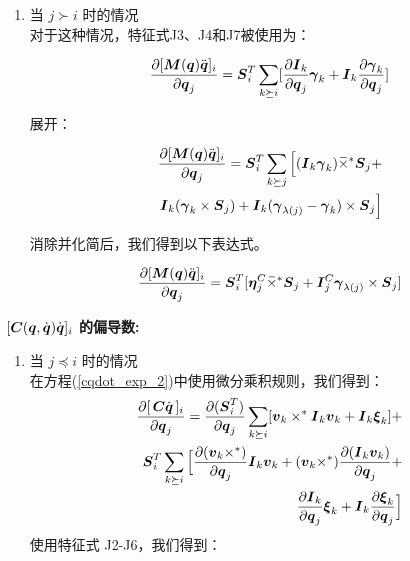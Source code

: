 \documentclass[letterpaper, 10 pt, conference]{ieeetran}  %
\begin{document}
{\begin{enumerate}
  
  \item 当 $j \succ i$ 时的情况\\
  对于这种情况，特征式J3、J4和J7被使用为：
  
  \begin{equation}
         \frac{\partial [ \M(\q) \qdd]_{i}}{\partial \q_{j}} =   \Phibar_{i}^{T}  \sum_{k \succeq i} [\frac{\partial \I_{k}}{\partial \q_{j}} \gammabar_{k} + \I_{k} \frac{\partial \gammabar_{k}}{\partial \q_{j}} ]  
        \label{partial_Mqddot_4}
\end{equation}
 
展开：
  
   \begin{equation}
      \begin{aligned}
       \frac{\partial [ \M(\q) \qdd]_{i}}{\partial \q_{j}} = 
     \Phibar_{i}^{T}  \sum_{ k \succeq j} \Big[(\I_{k} \gammabar_{k}) \crff \Phibar_{j} +  \\
     \I_{k}(\gammabar_{k} \times \Phibar_{j})+   \I_{k}  (\gammabar_{\lambda(j)} - \gammabar_{k} )  \times \Phibar_{j} \Big]  
        \label{partial_Mqddot_5}
      \end{aligned}
\end{equation} 

消除并化简后，我们得到以下表达式。

\begin{equation}
\frac{\partial [ \M(\q) \qdd]_{i}}{\partial \q_{j}} = \Phibar_{i}^{T} [\etabar_{j}^{C} \crff \Phibar_{j} + \I_{j}^{C} \gammabar_{\lambda(j)}\times \Phibar_{j}  ]
    \label{partial_Mqddot_6}
\end{equation}

 \end{enumerate} 


{\noindent \bf 
$[\boldsymbol{C}(\boldsymbol{q},\dot{\boldsymbol{q}}) \dot{\boldsymbol{q}}]_{i}$ 的偏导数:}


\begin{enumerate}
 \item 当 $j \preceq i$ 时的情况\\
  在方程(\ref{cqdot_exp_2})中使用微分乘积规则，我们得到：
  \begin{equation}
      \begin{aligned}
        \frac{\partial  [\,\boldsymbol{C} \dot{\boldsymbol{q}}\,]_{i}}{\partial \boldsymbol{q}_{j}} =  \frac{\partial (\boldsymbol{S}_{i}^{T})}{\partial \boldsymbol{q}_{j}} \sum_{k \succeq i} [\boldsymbol{v}_{k} \times^* \boldsymbol{I}{}_{k} \boldsymbol{v}_{k}+ \boldsymbol{I}{}_{k}  \boldsymbol{\xi}_{k}] +\\ 
        \boldsymbol{S}_{i}^{T}  \sum_{k \succeq i} \Big[\frac{\partial (\boldsymbol{v}_{k} \times^*)}{\partial \boldsymbol{q}_{j}} \boldsymbol{I}{}_{k} \boldsymbol{v}_{k} +  (\boldsymbol{v}_{k} \times^*) \frac{\partial (\boldsymbol{I}{}_{k} \boldsymbol{v}_{k})}{\partial \boldsymbol{q}_{j}} + \\
         \frac{\partial \boldsymbol{I}{}_{k} }{\partial \boldsymbol{q}_{j}} \boldsymbol{\xi}_{k} + \boldsymbol{I}{}_{k} \frac{\partial \boldsymbol{\xi}_{k} }{\partial \boldsymbol{q}_{j}} \Big]  
      \end{aligned}
\end{equation}
使用特征式 J2-J6，我们得到：
    

\end{enumerate}}
\end{document}
